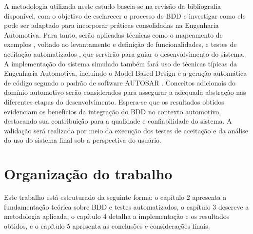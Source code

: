 A metodologia utilizada neste estudo baseia-se na revisão da bibliografia disponível, com o objetivo de esclarecer o processo de BDD e investigar como ele pode 
ser adaptado para incorporar práticas consolidadas na Engenharia Automotiva. Para tanto, serão aplicadas técnicas como o mapeamento de exemplos 
\cite{gosling2014cucumber, cucumberExampleMapping}
, voltado ao levantamento e definição de funcionalidades, e testes de aceitação automatizados 
\cite{studyBDD}
, que servirão para guiar o desenvolvimento do sistema.
A implementação do sistema simulado também fará uso de técnicas típicas da Engenharia Automotiva, incluindo o Model Based Design \cite{sangiovanni2001platform, mathworks2021mbd}
e a geração automática de código segundo o padrão de software AUTOSAR 
\cite{autosarClassic}. Conceitos adicionais do domínio automotivo serão considerados para 
assegurar a adequada abstração nas diferentes etapas do desenvolvimento.
Espera-se que os resultados obtidos evidenciam os benefícios da integração do BDD no contexto automotivo, destacando sua contribuição para a qualidade e 
confiabilidade do sistema. A validação será realizada por meio da execução dos testes de aceitação e da análise do uso do sistema final sob a perspectiva do usuário.

\section{Organização do trabalho}
Este trabalho está estruturado da seguinte forma: o capítulo 2 apresenta a fundamentação teórica sobre BDD e testes automatizados, 
o capítulo 3 descreve a metodologia aplicada, o capítulo 4 detalha a implementação e os resultados obtidos, e o capítulo 5 apresenta as conclusões e considerações finais.

